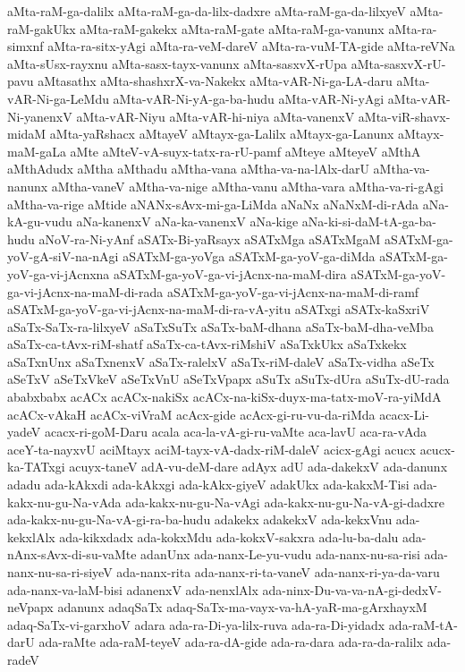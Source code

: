 {aMta-raM-ga-dalilx
aMta-raM-ga-da-lilx-dadxre
aMta-raM-ga-da-lilxyeV
aMta-raM-gakUkx
aMta-raM-gakekx
aMta-raM-gate
aMta-raM-ga-vanunx
aMta-ra-simxnf
aMta-ra-sitx-yAgi
aMta-ra-veM-dareV
aMta-ra-vuM-TA-gide
aMta-reVNa
aMta-sUsx-rayxnu
aMta-sasx-tayx-vanunx
aMta-sasxvX-rUpa
aMta-sasxvX-rU-pavu
aMtasathx
aMta-shashxrX-va-Nakekx
aMta-vAR-Ni-ga-LA-daru
aMta-vAR-Ni-ga-LeMdu
aMta-vAR-Ni-yA-ga-ba-hudu
aMta-vAR-Ni-yAgi
aMta-vAR-Ni-yanenxV
aMta-vAR-Niyu
aMta-vAR-hi-niya
aMta-vanenxV
aMta-viR-shavx-midaM
aMta-yaRshacx
aMtayeV
aMtayx-ga-Lalilx
aMtayx-ga-Lanunx
aMtayx-maM-gaLa
aMte
aMteV-vA-suyx-tatx-ra-rU-pamf
aMteye
aMteyeV
aMthA
aMthAdudx
aMtha
aMthadu
aMtha-vana
aMtha-va-na-lAlx-darU
aMtha-va-nanunx
aMtha-vaneV
aMtha-va-nige
aMtha-vanu
aMtha-vara
aMtha-va-ri-gAgi
aMtha-va-rige
aMtide
aNANx-sAvx-mi-ga-LiMda
aNaNx
aNaNxM-di-rAda
aNa-kA-gu-vudu
aNa-kanenxV
aNa-ka-vanenxV
aNa-kige
aNa-ki-si-daM-tA-ga-ba-hudu
aNoV-ra-Ni-yAnf
aSATx-Bi-yaRsayx
aSATxMga
aSATxMgaM
aSATxM-ga-yoV-gA-siV-na-nAgi
aSATxM-ga-yoVga
aSATxM-ga-yoV-ga-diMda
aSATxM-ga-yoV-ga-vi-jAcnxna
aSATxM-ga-yoV-ga-vi-jAcnx-na-maM-dira
aSATxM-ga-yoV-ga-vi-jAcnx-na-maM-di-rada
aSATxM-ga-yoV-ga-vi-jAcnx-na-maM-di-ramf
aSATxM-ga-yoV-ga-vi-jAcnx-na-maM-di-ra-vA-yitu
aSATxgi
aSATx-kaSxriV
aSaTx-SaTx-ra-lilxyeV
aSaTxSuTx
aSaTx-baM-dhana
aSaTx-baM-dha-veMba
aSaTx-ca-tAvx-riM-shatf
aSaTx-ca-tAvx-riMshiV
aSaTxkUkx
aSaTxkekx
aSaTxnUnx
aSaTxnenxV
aSaTx-ralelxV
aSaTx-riM-daleV
aSaTx-vidha
aSeTx
aSeTxV
aSeTxVkeV
aSeTxVnU
aSeTxVpapx
aSuTx
aSuTx-dUra
aSuTx-dU-rada
ababxbabx
acACx
acACx-nakiSx
acACx-na-kiSx-duyx-ma-tatx-moV-ra-yiMdA
acACx-vAkaH
acACx-viVraM
acAcx-gide
acAcx-gi-ru-vu-da-riMda
acacx-Li-yadeV
acacx-ri-goM-Daru
acala
aca-la-vA-gi-ru-vaMte
aca-lavU
aca-ra-vAda
aceY-ta-nayxvU
aciMtayx
aciM-tayx-vA-dadx-riM-daleV
acicx-gAgi
acucx
acucx-ka-TATxgi
acuyx-taneV
adA-vu-deM-dare
adAyx
adU
ada-dakekxV
ada-danunx
adadu
ada-kAkxdi
ada-kAkxgi
ada-kAkx-giyeV
adakUkx
ada-kakxM-Tisi
ada-kakx-nu-gu-Na-vAda
ada-kakx-nu-gu-Na-vAgi
ada-kakx-nu-gu-Na-vA-gi-dadxre
ada-kakx-nu-gu-Na-vA-gi-ra-ba-hudu
adakekx
adakekxV
ada-kekxVnu
ada-kekxlAlx
ada-kikxdadx
ada-kokxMdu
ada-kokxV-sakxra
ada-lu-ba-dalu
ada-nAnx-sAvx-di-su-vaMte
adanUnx
ada-nanx-Le-yu-vudu
ada-nanx-nu-sa-risi
ada-nanx-nu-sa-ri-siyeV
ada-nanx-rita
ada-nanx-ri-ta-vaneV
ada-nanx-ri-ya-da-varu
ada-nanx-va-laM-bisi
adanenxV
ada-nenxlAlx
ada-ninx-Du-va-va-nA-gi-dedxV-neVpapx
adanunx
adaqSaTx
adaq-SaTx-ma-vayx-va-hA-yaR-ma-gArxhayxM
adaq-SaTx-vi-garxhoV
adara
ada-ra-Di-ya-lilx-ruva
ada-ra-Di-yidadx
ada-raM-tA-darU
ada-raMte
ada-raM-teyeV
ada-ra-dA-gide
ada-ra-dara
ada-ra-da-ralilx
ada-radeV
}
